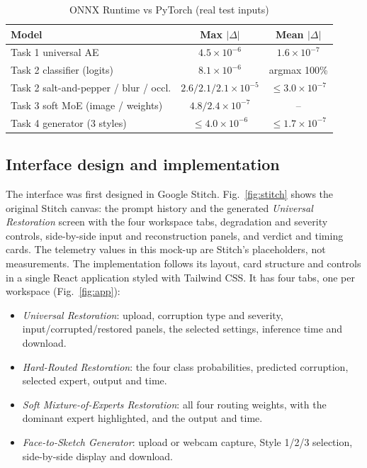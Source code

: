 \documentclass[conference]{IEEEtran}
\begin{document}
\begin{table}[!t]
\caption{ONNX Runtime vs PyTorch (real test inputs)}
\label{tab:onnx}
\centering\footnotesize
\begin{tabular}{@{}lcc@{}}
\toprule
Model & Max $|\Delta|$ & Mean $|\Delta|$\\
\midrule
Task 1 universal AE & $4.5{\times}10^{-6}$ & $1.6{\times}10^{-7}$\\
Task 2 classifier (logits) & $8.1{\times}10^{-6}$ & argmax 100\%\\
Task 2 salt-and-pepper / blur / occl. & $2.6/2.1/2.1{\times}10^{-5}$ & $\le3.0{\times}10^{-7}$\\
Task 3 soft MoE (image / weights) & $4.8/2.4{\times}10^{-7}$ & --\\
Task 4 generator (3 styles) & $\le4.0{\times}10^{-6}$ & $\le1.7{\times}10^{-7}$\\
\bottomrule
\end{tabular}
\end{table}

\subsection{Interface design and implementation}
The interface was first designed in Google Stitch. Fig.~\ref{fig:stitch} shows the original Stitch canvas: the prompt history and the generated \emph{Universal Restoration} screen with the four workspace tabs, degradation and severity controls, side-by-side input and reconstruction panels, and verdict and timing cards. The telemetry values in this mock-up are Stitch's placeholders, not measurements. The implementation follows its layout, card structure and controls in a single React application styled with Tailwind CSS. It has four tabs, one per workspace (Fig.~\ref{fig:app}):
\begin{itemize}
\item \emph{Universal Restoration}: upload, corruption type and severity, input/corrupted/restored panels, the selected settings, inference time and download.
\item \emph{Hard-Routed Restoration}: the four class probabilities, predicted corruption, selected expert, output and time.
\item \emph{Soft Mixture-of-Experts Restoration}: all four routing weights, with the dominant expert highlighted, and the output and time.
\item \emph{Face-to-Sketch Generator}: upload or webcam capture, Style 1/2/3 selection, side-by-side display and download.
\end{itemize}
\end{document}
